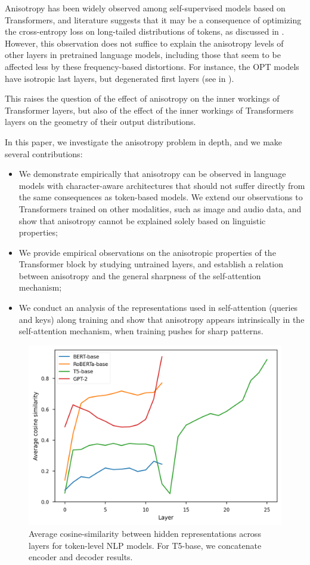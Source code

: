 

Anisotropy has been widely observed among self-supervised models based on Transformers, and literature suggests that it may be a consequence of optimizing the cross-entropy loss on long-tailed distributions of tokens, as discussed in . However, this observation does not suffice to explain the anisotropy levels of other layers in pretrained language models, including those that seem to be affected less by these frequency-based distortions. For instance, the OPT models \citep{zhang2022opt} have isotropic last layers, but degenerated first layers (see  in ).

This raises the question of the effect of anisotropy on the inner workings of Transformer layers, but also of the effect of the inner workings of Transformers layers on the geometry of their output distributions.


In this paper, we investigate the anisotropy problem in depth, and we make several contributions:
\begin{itemize}
    \item We demonstrate empirically that anisotropy can be observed in language models with character-aware architectures that should not suffer directly from the same consequences as token-based models. We extend our observations to Transformers trained on other modalities, such as image and audio data, and show that anisotropy cannot be explained solely based on linguistic properties;
    \item We provide empirical observations on the anisotropic properties of the Transformer block by studying untrained layers, and establish a relation between anisotropy and the general sharpness of the self-attention mechanism;
    \item We conduct an analysis of the representations used in self-attention (queries and keys) along training and show that anisotropy appears intrinsically in the self-attention mechanism, when training pushes for sharp patterns.
\end{itemize} 


\begin{figure}[ht]
    \centering
     \includegraphics[width=0.6\columnwidth]{sources/part_1/anisotropy/imgs/cosine_token.png}
     \caption{Average cosine-similarity between hidden representations across layers for token-level NLP models. For T5-base, we concatenate encoder and decoder results.}
     \label{fig:anisotropy_token}
\end{figure}

